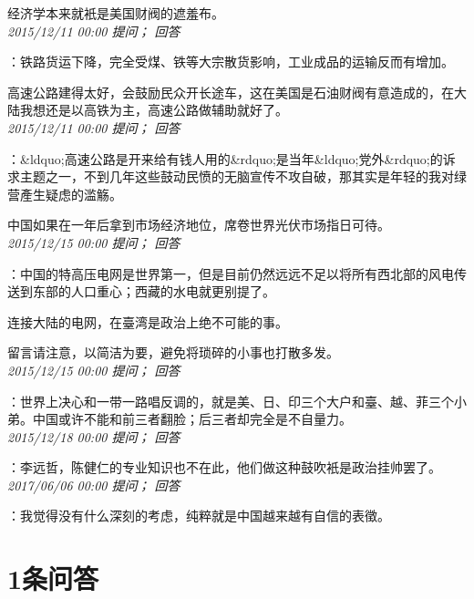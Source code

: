 \documentclass[twocolumn]{ctexart}
\begin{document}
经济学本来就衹是美国财阀的遮羞布。\\

\textit{\hfill\noindent\small 2015/12/11 00:00 提问； 回答}

：铁路货运下降，完全受煤、铁等大宗散货影响，工业成品的运输反而有增加。

高速公路建得太好，会鼓励民众开长途车，这在美国是石油财阀有意造成的，在大陆我想还是以高铁为主，高速公路做辅助就好了。\\

\textit{\hfill\noindent\small 2015/12/11 00:00 提问； 回答}

：\&ldquo;高速公路是开来给有钱人用的\&rdquo;是当年\&ldquo;党外\&rdquo;的诉求主题之一，不到几年这些鼓动民愤的无脑宣传不攻自破，那其实是年轻的我对绿营產生疑虑的滥觞。

中国如果在一年后拿到市场经济地位，席卷世界光伏市场指日可待。\\

\textit{\hfill\noindent\small 2015/12/15 00:00 提问； 回答}

：中国的特高压电网是世界第一，但是目前仍然远远不足以将所有西北部的风电传送到东部的人口重心；西藏的水电就更别提了。

连接大陆的电网，在臺湾是政治上绝不可能的事。

留言请注意，以简洁为要，避免将琐碎的小事也打散多发。\\

\textit{\hfill\noindent\small 2015/12/15 00:00 提问； 回答}

：世界上决心和一带一路唱反调的，就是美、日、印三个大户和臺、越、菲三个小弟。中国或许不能和前三者翻脸；后三者却完全是不自量力。\\

\textit{\hfill\noindent\small 2015/12/18 00:00 提问； 回答}

：李远哲，陈健仁的专业知识也不在此，他们做这种鼓吹衹是政治挂帅罢了。\\

\textit{\hfill\noindent\small 2017/06/06 00:00 提问； 回答}

：我觉得没有什么深刻的考虑，纯粹就是中国越来越有自信的表徵。\\

\section{1条问答}
\end{document}
